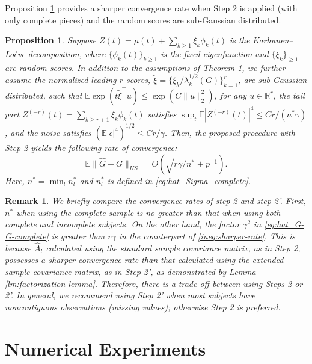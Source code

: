 \documentclass[11pt]{article}
\newtheorem{Remark}{Remark}
\newtheorem{Proposition}{Proposition}
\newcommand{\0}{{\mathbf{0}}}
\newcommand{\1}{{\mathbf{1}}}
\begin{document}
Proposition \ref{pr:complete} provides a sharper convergence rate when Step 2 is applied (with only complete pieces) and the random scores are sub-Gaussian distributed.

\begin{Proposition}\label{pr:complete}
	Suppose $Z(t) = \mu(t) + \sum_{k \geq 1}\xi_k\phi_k(t)$ is the Karhunen--Lo\`eve decomposition, where $\{\phi_k(t)\}_{k\geq 1}$ is the fixed eigenfunction and $\{\xi_k\}_{\geq 1}$ are random scores. In addition to the assumptions of Theorem 1, we further assume the normalized leading $r$ scores, $\tilde{\xi} = \{\xi_k/\lambda_k^{1/2}(G)\}_{k=1}^r$, are sub-Gaussian distributed, such that $\mathbb{E}\exp(t\tilde{\xi}^\top u) \leq \exp(C\|u\|_2^2)$, for any $u\in \mathbb{R}^r$, the tail part $Z^{(-r)}(t) = \sum_{k \geq r+1} \xi_k\phi_k(t)$ satisfies $\sup_t\mathbb{E}|Z^{(-r)}(t)|^4 \leq Cr/(n^\ast \gamma)$, and the noise satisfies $(\mathbb{E}|\epsilon|^4)^{1/2} \leq Cr/\gamma$. Then, the proposed procedure with Step 2 yields the following rate of convergence:
	\begin{equation}\label{ineq:sharper-rate}
	\mathbb{E}\|\hat{G} - G\|_{HS} = O\left(\sqrt{r\gamma/n^\ast} + p^{-1}\right).
	\end{equation}
	Here,  $n^\ast = \min_{l}n_l^\ast$ and $n_l^\ast$ is defined in \eqref{eq:hat_Sigma_complete}.
\end{Proposition} 


\begin{Remark}
	\label{rm:theorem1-2-comparison}\rm 
	We briefly compare the convergence rates of step 2 and step 2'. First, $n^\ast$ when using the complete sample is no greater than that when using both complete and incomplete subjects.  On the other hand, the factor $\gamma^2$ in \eqref{eq:hat_G-G-complete} is greater than $r\gamma$ in the counterpart of \eqref{ineq:sharper-rate}. This is because $\hat{A}_l$ calculated using the standard sample covariance matrix, as in Step 2, possesses a sharper convergence rate than that calculated using the extended sample covariance matrix, as in Step 2', as demonstrated by Lemma \ref{lm:factorization-lemma}. Therefore, there is a trade-off between using Steps 2 or 2'. In general, we recommend using Step 2' when most subjects have noncontiguous observations (missing values); otherwise Step 2 is preferred. 
\end{Remark}


\section{Numerical Experiments}\label{sec:numerical}
\end{document}
